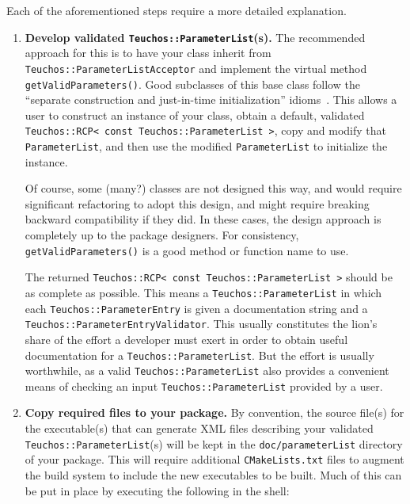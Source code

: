 \documentclass[pdf,ps2pdf,12pt]{smemo}
\begin{document}
\begin{memo}
Each of the aforementioned steps require a more detailed explanation.

\begin{enumerate}

\item \textbf{Develop validated \texttt{Teuchos::ParameterList}(s).}
  The recommended approach for this is to have your class inherit from
  \texttt{Teuchos::ParameterListAcceptor} and implement the virtual
  method \texttt{getValidParameters()}.  Good subclasses of this base
  class follow the ``separate construction and just-in-time
  initialization'' idioms~\cite{TeuchosMemMgt}.  This allows a user to
  construct an instance of your class, obtain a default, validated
  \texttt{Teuchos::RCP< const Teuchos::ParameterList >}, copy and
  modify that \texttt{ParameterList}, and then use the modified
  \texttt{ParameterList} to initialize the instance.

  Of course, some (many?) classes are not designed this way, and would
  require significant refactoring to adopt this design, and might
  require breaking backward compatibility if they did.  In these
  cases, the design approach is completely up to the package
  designers.  For consistency, \texttt{getValidParameters()} is a good
  method or function name to use.

  The returned \texttt{Teuchos::RCP< const Teuchos::ParameterList >}
  should be as complete as possible.  This means a
  \texttt{Teuchos::ParameterList} in which each
  \texttt{Teuchos::Pa\-ra\-met\-er\-En\-try} is given a documentation
  string and a
  \texttt{Teuchos::Pa\-ra\-me\-ter\-En\-try\-Val\-i\-da\-tor}. This
  usually constitutes the lion's share of the effort a developer must
  exert in order to obtain useful documentation for a
  \texttt{Teuchos::ParameterList}.  But the effort is usually
  worthwhile, as a valid \texttt{Teuchos::ParameterList} also provides
  a convenient means of checking an input
  \texttt{Teuchos::ParameterList} provided by a user.

\item \textbf{Copy required files to your package.} By convention, the
  source file(s) for the executable(s) that can generate XML files
  describing your validated \texttt{Teuchos::Pa\-ra\-me\-ter\-List}(s)
  will be kept in the \texttt{doc/parameterList} directory of your
  package. This will require additional \texttt{CMakeLists.txt} files
  to augment the build system to include the new executables to be
  built. Much of this can be put in place by executing the following
  in the shell:


\end{enumerate}
\end{memo}
\end{document}

